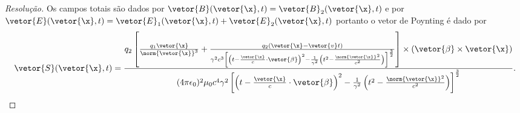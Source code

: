 \begin{proof}[Resolução]
   Os campos totais são dados por \(\vetor{B}(\vetor{\x}, t) = \vetor{B}_2(\vetor{\x}, t)\) e por \(\vetor{E}(\vetor{\x},t) = \vetor{E}_1(\vetor{\x}, t) + \vetor{E}_2(\vetor{\x}, t)\) portanto o vetor de Poynting é dado por
   \begin{equation*}
      \vetor{S}(\vetor{\x}, t) 
      = \frac{q_2\left[\frac{q_1\vetor{\x} }{\norm{\vetor{\x}}^3} + \frac{q_2(\vetor{\x} - \vetor{v}t) }{\gamma^2 c^3 \left[\left(t - \frac{\vetor{\x}}{c} \cdot \vetor{\beta}\right)^2 - \frac{1}{\gamma^2} \left(t^2 - \frac{\norm{\vetor{\x}}^2}{c^2}\right)\right]^{\frac32}}\right]\times (\vetor{\beta} \times \vetor{\x})}{(4\pi \epsilon_0)^2 \mu_0 c^4 \gamma^2 \left[\left(t - \frac{\vetor{\x}}{c} \cdot \vetor{\beta}\right)^2 - \frac{1}{\gamma^2} \left(t^2 - \frac{\norm{\vetor{\x}}^2}{c^2}\right)\right]^{\frac32}}.
   \end{equation*}


\end{proof}
